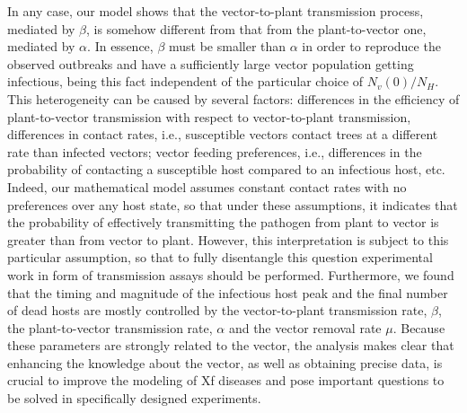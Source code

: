 In any case, our model shows that the vector-to-plant transmission process,
mediated by $\beta$, is somehow different from that from the plant-to-vector
one, mediated by $\alpha$. In essence, $\beta$ must be smaller than $\alpha$ in
order to reproduce the observed outbreaks and have a sufficiently large vector
population getting infectious, being this fact independent of the particular
choice of $N_v(0)/N_H$. This heterogeneity can be caused by several factors:
differences in the efficiency of plant-to-vector transmission with respect to
vector-to-plant transmission, differences in contact rates, i.e., susceptible
vectors contact trees at a different rate than infected vectors; vector feeding
preferences, i.e., differences in the probability of contacting a susceptible
host compared to an infectious host, etc. Indeed, our mathematical model
assumes constant contact rates with no preferences over any host state, so that
under these assumptions, it indicates that the probability of effectively
transmitting the pathogen from plant to vector is greater than from vector to
plant. However, this interpretation is subject to this particular assumption,
so that to fully disentangle this question experimental work in form of
transmission assays should be performed. Furthermore, we found that the timing
and magnitude of the infectious host peak and the final number of dead hosts
are mostly controlled by the vector-to-plant transmission rate, $\beta$, the
plant-to-vector transmission rate, $\alpha$ and the vector removal rate $\mu$.
Because these parameters are strongly related to the vector, the analysis makes
clear that enhancing the knowledge about the vector, as well as obtaining
precise data, is crucial to improve the modeling of Xf diseases and pose
important questions to be solved in specifically designed experiments.

